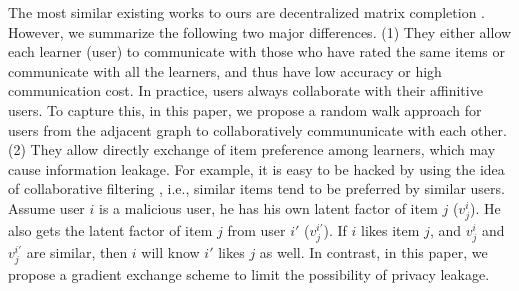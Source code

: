 The most similar existing works to ours are decentralized matrix completion \cite{ling2012decentralized,yun2014nomad}. 
However, we summarize the following two major differences. 
(1) They either allow each learner (user) to communicate with those who have rated the same items or communicate with all the learners, and thus have low accuracy or high communication cost. 
In practice, users always collaborate with their affinitive users. 
To capture this, in this paper, we propose a random walk approach for users from the adjacent graph to collaboratively commununicate with each other. 
(2) They allow directly exchange of item preference among learners, which may cause information leakage. 
For example, it is easy to be hacked by using the idea of collaborative filtering \cite{sarwar2001item}, i.e., similar items tend to be preferred by similar users. 
Assume user $i$ is a malicious user, he has his own latent factor of item $j$ ($v^i_j$). 
He also gets the latent factor of item $j$ from user $i'$ ($v^{i'}_j$). 
If $i$ likes item $j$, and $v^i_j$ and $v^{i'}_j$ are similar, then $i$ will know $i'$ likes $j$ as well.
In contrast, in this paper, we propose a gradient exchange scheme to limit the possibility of privacy leakage. 


